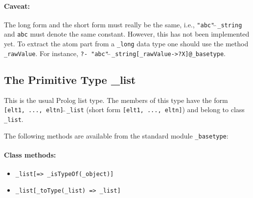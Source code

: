 \documentclass[11pt]{article}
\begin{document}
\paragraph{Caveat:} The long form and the short form must really be the
same, i.e., {\tt "abc"$\hat{~}\hat{~}$\_string} and {\tt abc} must denote the
same constant.  However, this has not been implemented yet.
To extract the atom part from a {\tt \_long}  data type one should use
the method {\tt \_rawValue}.  For instance, {\tt ?-
  "abc"$\hat{~}\hat{~}$\_string[\_rawValue->?X]@\_basetype}.


\subsection{ The Primitive Type \_list}

This is the usual Prolog list type.
The members of this type have the form 
{\tt [elt1, ..., eltn]$\hat{~}\hat{~}$\_list}
(short form {\tt [elt1, ..., eltn]}) and belong to class
{\tt \_list}. 

The following methods are available from the standard module {\tt \_basetype}: 
\paragraph{Class methods:}
\begin{itemize}
\item {\tt \_list[=> \_isTypeOf(\_object)]}  
\item {\tt \_list[\_toType(\_list) => \_list]}  
\end{itemize}
\end{document}
